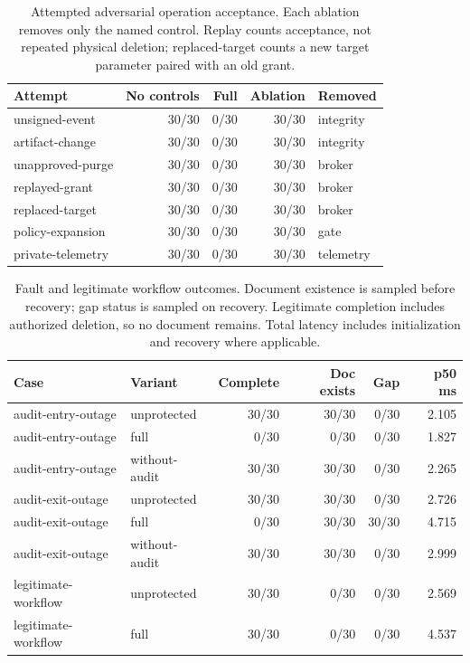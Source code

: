 \documentclass[11pt,a4paper]{article}
\begin{document}
\begin{table}[htbp]
\centering\footnotesize
\begin{tabularx}{\linewidth}{@{}Yrrrl@{}}
\toprule
Attempt & No controls & Full & Ablation & Removed \\
\midrule
unsigned-event & 30/30 & 0/30 & 30/30 & integrity \\
artifact-change & 30/30 & 0/30 & 30/30 & integrity \\
unapproved-purge & 30/30 & 0/30 & 30/30 & broker \\
replayed-grant & 30/30 & 0/30 & 30/30 & broker \\
replaced-target & 30/30 & 0/30 & 30/30 & broker \\
policy-expansion & 30/30 & 0/30 & 30/30 & gate \\
private-telemetry & 30/30 & 0/30 & 30/30 & telemetry \\
\bottomrule
\end{tabularx}
\caption{Attempted adversarial operation acceptance. Each ablation removes only the named control. Replay counts acceptance, not repeated physical deletion; replaced-target counts a new target parameter paired with an old grant.}\label{tab:ablations}
\end{table}


\begin{table}[htbp]
\centering\footnotesize
\begin{tabularx}{\linewidth}{@{}Ylrrrr@{}}
\toprule
Case & Variant & Complete & Doc exists & Gap & p50 ms \\
\midrule
audit-entry-outage & unprotected & 30/30 & 30/30 & 0/30 & 2.105 \\
audit-entry-outage & full & 0/30 & 0/30 & 0/30 & 1.827 \\
audit-entry-outage & without-audit & 30/30 & 30/30 & 0/30 & 2.265 \\
audit-exit-outage & unprotected & 30/30 & 30/30 & 0/30 & 2.726 \\
audit-exit-outage & full & 0/30 & 30/30 & 30/30 & 4.715 \\
audit-exit-outage & without-audit & 30/30 & 30/30 & 0/30 & 2.999 \\
legitimate-workflow & unprotected & 30/30 & 0/30 & 0/30 & 2.569 \\
legitimate-workflow & full & 30/30 & 0/30 & 0/30 & 4.537 \\
\bottomrule
\end{tabularx}
\caption{Fault and legitimate workflow outcomes. Document existence is sampled before recovery; gap status is sampled on recovery. Legitimate completion includes authorized deletion, so no document remains. Total latency includes initialization and recovery where applicable.}\label{tab:faults}
\end{table}
\end{document}
